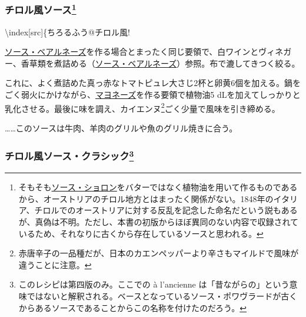 \begin{recette}
\atoaki{}

\hypertarget{sauce-tyrolienne}{%
\subsubsection[チロル風ソース]{\texorpdfstring{チロル風ソース\footnote{そもそも\protect\hyperlink{sauce-choron}{ソース・ショロン}をバターではなく植物油を用いて作るものであるから、オーストリアのチロル地方とはまったく関係がない。1848年のイタリア、チロルでのオーストリアに対する反乱を記念した命名だという説もあるが、真偽は不明。ただし、本書の初版からほぼ異同のない内容で収録されているため、それなりに古くから存在しているソースと思われる。}}{チロル風ソース}}\label{sauce-tyrolienne}}


\textbackslash{}index{[}src{]}\{ちろるふう@チロル風!

\protect\hyperlink{sauce-bearnaise}{ソース・ベアルネーズ}を作る場合とまったく同じ要領で、白ワインとヴィネガー、香草類を煮詰める（\protect\hyperlink{sauce-bearnaise}{ソース・ベアルネーズ}）参照。布で漉してきつく絞る。

これに、よく煮詰めた真っ赤なトマトピュレ大さじ2杯と卵黄6個を加える。鍋をごく弱火にかけながら、\protect\hyperlink{mayonnaise}{マヨネーズ}を作る要領で植物油5
dLを加えてしっかりと乳化させる。最後に味を調え、カイエンヌ\footnote{赤唐辛子の一品種だが、日本のカエンペッパーより辛さもマイルドで風味が違うことに注意。}ごく少量で風味を引き締める。

\ldots{}\ldots{}このソースは牛肉、羊肉のグリルや魚のグリル焼きに合う。

\atoaki{}

\hypertarget{sauce-tyrolienne-ancienne}{%
\subsubsection[チロル風ソース・クラシック]{\texorpdfstring{チロル風ソース・クラシック\footnote{このレシピは第四版のみ。ここでの
  à l'ancienne
  は「昔ながらの」という意味ではないと解釈される。ベースとなっているソース・ポワヴラードが古くからあるソースであることからこの名称を付けたのだろう。}}{チロル風ソース・クラシック}}\label{sauce-tyrolienne-ancienne}}



\end{recette}
